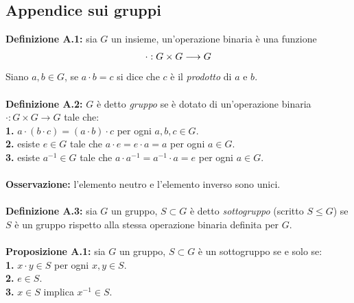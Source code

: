 \documentclass{article}
\begin{document}
\subsection{Appendice sui gruppi}
\textbf{Definizione A.1:} sia $G$ un insieme, un'operazione binaria è una funzione
\begin{gather}
    \cdot : G \times G \longrightarrow G \notag
\end{gather}
Siano $a, b \in G$, se $a \cdot b = c$ si dice che $c$ è il \textit{prodotto} di $a$ e $b$. \\ \\
\textbf{Definizione A.2:} $G$ è detto \textit{gruppo} se è dotato di un'operazione binaria \\ $\cdot : G \times G \longrightarrow G$ tale che: \\
\textbf{1.} $a \cdot (b \cdot c) = (a \cdot b) \cdot c$ per ogni $a, b, c \in G$. \\
\textbf{2.} esiste $e \in G$ tale che $a \cdot e = e \cdot a = a$ per ogni $a \in G$. \\
\textbf{3.} esiste $a^{-1} \in G$ tale che $a \cdot a^{-1} = a^{-1} \cdot a = e$ per ogni $a \in G$. \\ \\
\textbf{Osservazione:} l'elemento neutro e l'elemento inverso sono unici. \\ \\
\textbf{Definizione A.3:} sia $G$ un gruppo, $S \subset G$ è detto \textit{sottogruppo} (scritto $S \leq G$) se $S$ è un gruppo rispetto alla stessa operazione binaria definita per $G$. \\ \\
\textbf{Proposizione A.1:} sia $G$ un gruppo, $S \subset G$ è un sottogruppo se e solo se: \\
\textbf{1.} $x \cdot y \in S$ per ogni $x, y \in S$. \\
\textbf{2.} $e \in S$. \\
\textbf{3.} $x \in S$ implica $x^{-1} \in S$. \\
\end{document}
